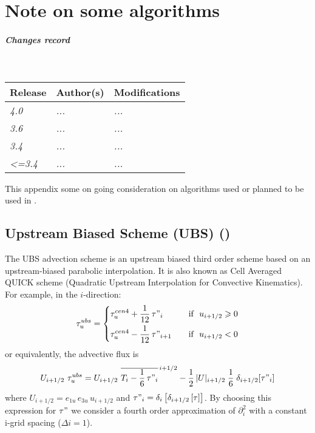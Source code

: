 \documentclass[../main/NEMO_manual]{subfiles}
\begin{document}
\chapter{Note on some algorithms}
\label{apdx:ALGOS}

\thispagestyle{plain}

\chaptertoc

\paragraph{Changes record} ~\\

{\footnotesize
  \begin{tabularx}{\textwidth}{l||X|X}
    Release & Author(s) & Modifications \\
    \hline
    {\em   4.0} & {\em ...} & {\em ...} \\
    {\em   3.6} & {\em ...} & {\em ...} \\
    {\em   3.4} & {\em ...} & {\em ...} \\
    {\em <=3.4} & {\em ...} & {\em ...}
  \end{tabularx}
}

\clearpage

This appendix some on going consideration on algorithms used or planned to be used in \NEMO.

\section{Upstream Biased Scheme (UBS) (\protect{})}
\label{sec:ALGOS_tra_adv_ubs}

The UBS advection scheme is an upstream biased third order scheme based on
an upstream-biased parabolic interpolation.
It is also known as Cell Averaged QUICK scheme (Quadratic Upstream Interpolation for Convective Kinematics).
For example, in the $i$-direction:
\begin{equation}
  \label{eq:ALGOS_tra_adv_ubs2}
  \tau_u^{ubs} = \left\{
	 \begin{aligned}
      & \tau_u^{cen4} + \frac{1}{12} \,\tau"_i	   & \quad \text{if }\ u_{i+1/2} \geqslant 0 \\
      & \tau_u^{cen4} - \frac{1}{12} \,\tau"_{i+1} & \quad \text{if }\ u_{i+1/2}       <       0
    \end{aligned}
  \right.
\end{equation}
or equivalently, the advective flux is
\begin{equation}
  \label{eq:ALGOS_tra_adv_ubs2}
  U_{i+1/2} \ \tau_u^{ubs}
  =U_{i+1/2} \ \overline{ T_i - \frac{1}{6}\,\tau"_i }^{\,i+1/2}
  - \frac{1}{2}\, |U|_{i+1/2} \;\frac{1}{6} \;\delta_{i+1/2}[\tau"_i]
\end{equation}
where $U_{i+1/2} = e_{1u}\,e_{3u}\,u_{i+1/2}$ and
$\tau "_i =\delta_i \left[ {\delta_{i+1/2} \left[ \tau \right]} \right]$.
By choosing this expression for $\tau "$ we consider a fourth order approximation of $\partial_i^2$ with
a constant i-grid spacing ($\Delta i=1$).
\end{document}
